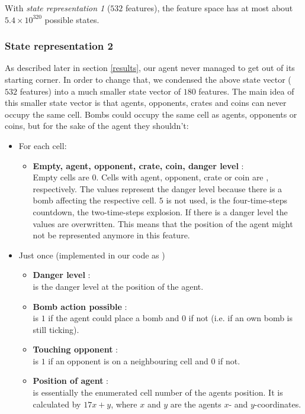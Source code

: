	With \textit{state representation 1} ($532$ features), the feature space has at most about $5.4 \times 10^{320}$ possible states. 
	
	\subsubsection{State representation 2}
	\label{State_rep_2}
	As described later in section \ref{results}, our agent never managed to get out of its starting corner. In order to change that, we condensed the above state vector ($532$ features) into a much smaller state vector of $180$ features. The main idea of this smaller state vector is that agents, opponents, crates and coins can never occupy the same cell. Bombs could occupy the same cell as agents, opponents or coins, but for the sake of the agent they shouldn't:
	
	\begin{itemize}
		\item For each cell:
		\begin{itemize}
			\item \textbf{Empty, agent, opponent, crate, coin, danger level} :\\
			Empty cells are $0$. Cells with agent, opponent, crate or coin are , respectively. The values  represent the danger level because there is a bomb affecting the respective cell. $5$ is not used,  is the four-time-steps countdown,  the two-time-steps explosion. If there is a danger level the values  are overwritten. This means that the position of the agent might not be represented anymore in this feature.
		\end{itemize}
		\item Just once (implemented in our code as )
		\begin{itemize}
			\item \textbf{Danger level} :\\ 
			 is the danger level at the position of the agent.
			\item \textbf{Bomb action possible} : \\
			 is $1$ if the agent could place a bomb and $0$ if not (i.e. if an own bomb is still ticking).
			\item \textbf{Touching opponent} : \\
			 is $1$ if an opponent is on a neighbouring cell and $0$ if not.
			\item \textbf{Position of agent} : \\
			 is essentially the enumerated cell number of the agents position. It is calculated by $17x + y$, where $x$ and $y$ are the agents $x$- and $y$-coordinates. 
		\end{itemize} 
	\end{itemize}
	
